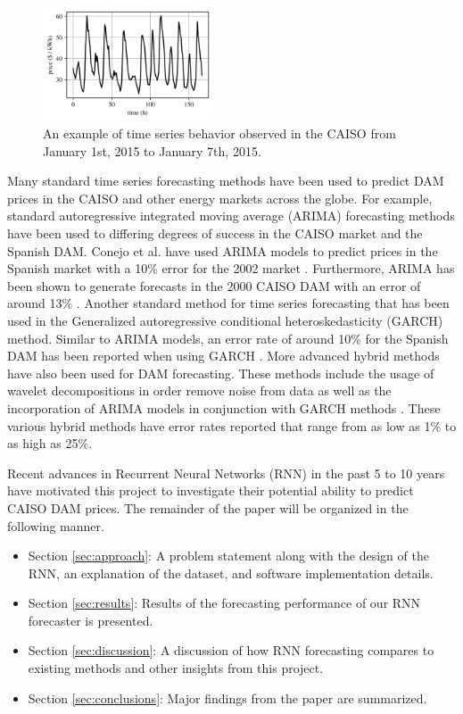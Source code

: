 \documentclass[sigconf]{acmart}
\begin{document}
\begin{figure}[h]
\includegraphics[width=0.45\textwidth]{fig_1.png}
\caption{An example of time series behavior observed in the CAISO from January 1st, 2015 to January 7th, 2015.}
\label{fig:ex_prices}
\end{figure}

Many standard time series forecasting methods have been used to predict DAM prices in the CAISO and other energy markets across the globe. For example, standard autoregressive integrated moving average (ARIMA) forecasting methods have been used to differing degrees of success in the CAISO market and the Spanish DAM. Conejo et al. have used ARIMA models to predict prices in the Spanish market with a 10\% error for the 2002 market \cite{Conejo2005a}. Furthermore, ARIMA has been shown to generate forecasts in the 2000 CAISO DAM with an error of around 13\% \cite{Garcia2005}. Another standard method for time series forecasting that has been used in the  Generalized autoregressive conditional heteroskedasticity (GARCH) method. Similar to ARIMA models, an error rate of around 10\% for the Spanish DAM has been reported when using GARCH \cite{Garcia2005}. More advanced hybrid methods have also been used for DAM forecasting. These methods include the usage of wavelet decompositions in order remove noise from data as well as the incorporation of ARIMA models in conjunction with GARCH methods \cite{Conejo2005,Tan2010,Amjady2008,Wang2012}. These various hybrid methods have error rates reported that range from as low as 1\% to as high as 25\%. 


Recent advances in Recurrent Neural Networks (RNN) in the past 5 to 10 years have motivated this project to investigate their potential ability to predict CAISO DAM prices. The remainder of the paper will be organized in the following manner.

\begin{itemize}
	\item Section \ref{sec:approach}: A problem statement along with the design of the RNN, an explanation of the dataset, and software implementation details.
	\item Section \ref{sec:results}: Results of the forecasting performance of our RNN forecaster is presented.
	\item Section \ref{sec:discussion}: A discussion of how RNN forecasting compares to existing methods and other insights from this project.
	\item Section \ref{sec:conclusions}: Major findings from the paper are summarized.
\end{itemize}
\end{document}
